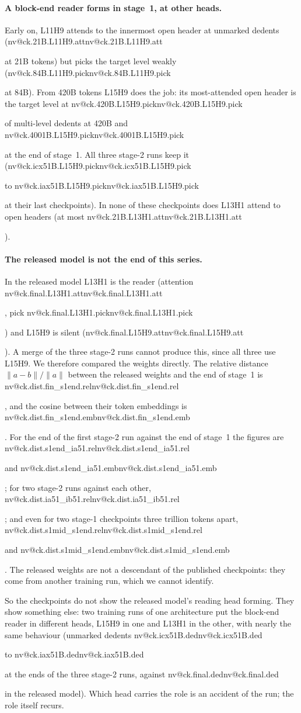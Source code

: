\documentclass[11pt]{article}
\makeatletter
\newcommand{\nv}[1]{\ifcsname nv@#1\endcsname\csname nv@#1\endcsname\else\PackageError{numbers}{Unknown number key #1}{}\fi}
\newcommand{\hd}[2]{L#1H#2}
\makeatother
\begin{document}
\paragraph{A block-end reader forms in stage~1, at other heads.} Early on, \hd{11}{9} attends to the innermost open header at unmarked dedents (\nv{ck.21B.L11H9.att} at 21B tokens) but picks the target level weakly (\nv{ck.84B.L11H9.pick} at 84B). From 420B tokens \hd{15}{9} does the job: its most-attended open header is the target level at \nv{ck.420B.L15H9.pick} of multi-level dedents at 420B and \nv{ck.4001B.L15H9.pick} at the end of stage~1. All three stage-2 runs keep it (\nv{ck.icx51B.L15H9.pick} to \nv{ck.iax51B.L15H9.pick} at their last checkpoints). In none of these checkpoints does \hd{13}{1} attend to open headers (at most \nv{ck.21B.L13H1.att}).

\paragraph{The released model is not the end of this series.} In the released model \hd{13}{1} is the reader (attention \nv{ck.final.L13H1.att}, pick \nv{ck.final.L13H1.pick}) and \hd{15}{9} is silent (\nv{ck.final.L15H9.att}). A merge of the three stage-2 runs cannot produce this, since all three use \hd{15}{9}. We therefore compared the weights directly. The relative distance $\lVert a-b\rVert/\lVert a\rVert$ between the released weights and the end of stage~1 is \nv{ck.dist.fin_s1end.rel}, and the cosine between their token embeddings is \nv{ck.dist.fin_s1end.emb}. For the end of the first stage-2 run against the end of stage~1 the figures are \nv{ck.dist.s1end_ia51.rel} and \nv{ck.dist.s1end_ia51.emb}; for two stage-2 runs against each other, \nv{ck.dist.ia51_ib51.rel}; and even for two stage-1 checkpoints three trillion tokens apart, \nv{ck.dist.s1mid_s1end.rel} and \nv{ck.dist.s1mid_s1end.emb}. The released weights are not a descendant of the published checkpoints: they come from another training run, which we cannot identify.

So the checkpoints do not show the released model's reading head forming. They show something else: two training runs of one architecture put the block-end reader in different heads, \hd{15}{9} in one and \hd{13}{1} in the other, with nearly the same behaviour (unmarked dedents \nv{ck.icx51B.ded} to \nv{ck.iax51B.ded} at the ends of the three stage-2 runs, against \nv{ck.final.ded} in the released model). Which head carries the role is an accident of the run; the role itself recurs.
\end{document}
